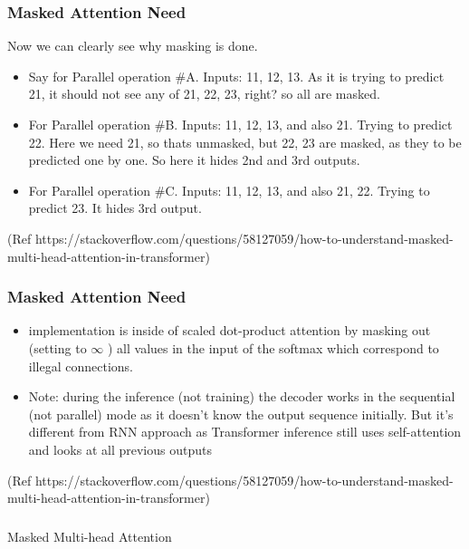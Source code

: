 \begin{frame}[fragile]\frametitle{Masked Attention Need}

Now we can clearly see why masking is done.

\begin{itemize}
  \item  Say for Parallel operation \#A. Inputs: 11, 12, 13. As it is trying to predict 21, it should not see any of 21, 22, 23, right? so all are masked.
  \item For Parallel operation \#B. Inputs: 11, 12, 13, and also 21. Trying to predict 22. Here we need 21, so thats unmasked, but 22, 23 are masked, as they to be predicted one by one. So here it hides  2nd and 3rd outputs.
	\item For Parallel operation \#C. Inputs: 11, 12, 13, and also 21, 22. Trying to predict 23. It hides 3rd output.
\end{itemize}

{\tiny (Ref https://stackoverflow.com/questions/58127059/how-to-understand-masked-multi-head-attention-in-transformer)}

\end{frame}

\begin{frame}[fragile]\frametitle{Masked Attention Need}


\begin{itemize}
  \item   implementation is inside of scaled dot-product attention by masking out (setting to $\infty$ ) all values in the input of the softmax which correspond to illegal connections.
  \item Note: during the inference (not training) the decoder works in the sequential (not parallel) mode as it doesn't know the output sequence initially. But it's different from RNN approach as Transformer inference still uses self-attention and looks at all previous outputs
\end{itemize}

{\tiny (Ref https://stackoverflow.com/questions/58127059/how-to-understand-masked-multi-head-attention-in-transformer)}

\end{frame}

\begin{frame}[fragile]\frametitle{}
\begin{center}
{\Large Masked Multi-head Attention}
\end{center}
\end{frame}


